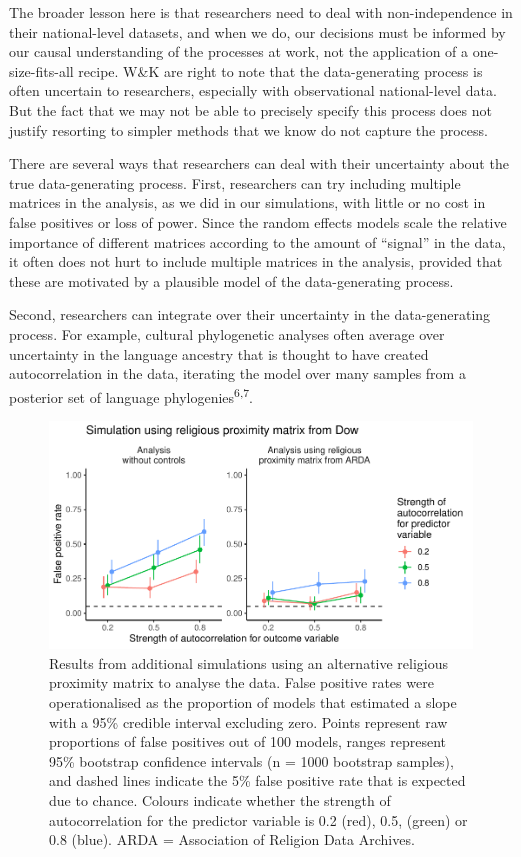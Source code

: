 \documentclass[
  11pt,
]{article}
\begin{document}
The broader lesson here is that researchers need to deal with non-independence
in their national-level datasets, and when we do, our decisions must be informed
by our causal understanding of the processes at work, not the application of a
one-size-fits-all recipe. W\&K are right to note that the data-generating process
is often uncertain to researchers, especially with observational national-level
data. But the fact that we may not be able to precisely specify this process
does not justify resorting to simpler methods that we know do not capture the
process.

There are several ways that researchers can deal with their uncertainty about
the true data-generating process. First, researchers can try including multiple
matrices in the analysis, as we did in our simulations, with little or no cost
in false positives or loss of power. Since the random effects models scale the
relative importance of different matrices according to the amount of ``signal'' in
the data, it often does not hurt to include multiple matrices in the analysis,
provided that these are motivated by a plausible model of the data-generating
process.

Second, researchers can integrate over their uncertainty in the data-generating
process. For example, cultural phylogenetic analyses often average over
uncertainty in the language ancestry that is thought to have created
autocorrelation in the data, iterating the model over many samples from a
posterior set of language phylogenies\textsuperscript{6,7}.

\begin{figure}
\centering
\includegraphics{manuscript_files/figure-latex/plot-1.pdf}
\caption{\label{fig:plot}Results from additional simulations using an alternative religious proximity matrix to analyse the data. False positive rates were operationalised as the proportion of models that estimated a slope with a 95\% credible interval excluding zero. Points represent raw proportions of false positives out of 100 models, ranges represent 95\% bootstrap confidence intervals (n = 1000 bootstrap samples), and dashed lines indicate the 5\% false positive rate that is expected due to chance. Colours indicate whether the strength of autocorrelation for the predictor variable is 0.2 (red), 0.5, (green) or 0.8 (blue). ARDA = Association of Religion Data Archives.}
\end{figure}
\end{document}

